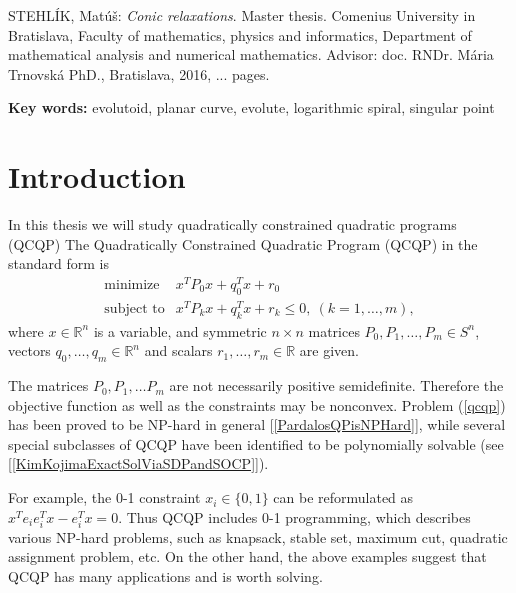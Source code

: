 \documentclass[12pt]{book}
\theoremstyle{definition}
\begin{document}
STEHLÍK, Matúš: {\it Conic relaxations}. Master thesis. Comenius University in Bratislava, Faculty of mathematics, physics and informatics, Department of mathematical analysis and numerical mathematics. Advisor: doc. RNDr. Mária Trnovská PhD., Bratislava, 2016, ... pages.

\bigskip


\bigskip

{\bf Key words: } evolutoid, planar curve, evolute, logarithmic spiral, singular point

\vfill\null\eject

\tableofcontents
\listoffigures

\mainmatter

\chapter*{Introduction}

In this thesis we will study quadratically constrained quadratic programs (QCQP)
\label{defQCQP}
The Quadratically Constrained Quadratic Program (QCQP) in the standard form is
\begin{equation}
\label{qcqp} 
\begin{array}{ll}
\mbox{minimize}& x^TP_0x + q_0^Tx +r_0 \\
\mbox{subject to}& x^TP_kx + q_k^Tx + r_k \leq 0, \  (k = 1,\dots ,m),
\end{array} 
\end{equation}
where $x\in \mathbb{R}^n$ is a variable, and symmetric $n\times n$ matrices $P_0, P_1, \dots ,P_m \in S^n$, vectors $q_0,\dots ,q_m \in \mathbb{R}^n$ and scalars $r_1,\dots ,r_m\in \mathbb{R}$ are given.

The matrices $P_0, P_1, \dots P_m$ are not necessarily positive semidefinite. Therefore the objective function as well as the constraints may be nonconvex. Problem (\ref{qcqp}) has been proved to be NP-hard in general [\ref{PardalosQPisNPHard}], while several special subclasses
of QCQP have been identified to be polynomially solvable (see [\ref{KimKojimaExactSolViaSDPandSOCP}]).

For example, the 0-1 constraint $x_i\in \{0,1\}$ can be reformulated as $x^Te_ie_i^Tx - e_i^Tx =0$. Thus QCQP includes 0-1 programming, which describes various NP-hard problems, such as knapsack, stable set, maximum cut, quadratic assignment problem,  etc. 
On the other hand, the above examples suggest that QCQP has many applications and is worth solving.
\end{document}
